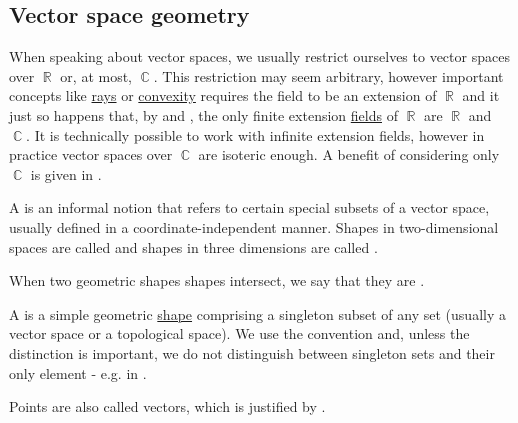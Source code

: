 \subsection{Vector space geometry}\label{subsec:vector_space_geometry}

\begin{remark}\label{rem:real_field_extensions}
  When speaking about vector spaces, we usually restrict ourselves to vector spaces over \( \BbbR \) or, at most, \( \BbbC \). This restriction may seem arbitrary, however important concepts like \hyperref[def:geometric_ray]{rays} or \hyperref[def:convex_set]{convexity} requires the field to be an extension of \( \BbbR \) and it just so happens that, by  and , the only finite extension \hyperref[def:field_extension]{fields} of \( \BbbR \) are \( \BbbR \) and \( \BbbC \). It is technically possible to work with infinite extension fields, however in practice vector spaces over \( \BbbC \) are isoteric enough. A benefit of considering only \( \BbbC \) is given in .
\end{remark}

\begin{definition}\label{def:geometric_shape}
  A  is an informal notion that refers to certain special subsets of a vector space, usually defined in a coordinate-independent manner. Shapes in two-dimensional spaces are called  and shapes in three dimensions are called .

  When two geometric shapes shapes intersect, we say that they are .
\end{definition}

\begin{definition}\label{def:point}
  A  is a simple geometric \hyperref[def:geometric_shape]{shape} comprising a singleton subset of any set (usually a vector space or a topological space). We use the convention  and, unless the distinction is important, we do not distinguish between singleton sets and their only element - e.g. in .

  Points are also called vectors, which is justified by .
\end{definition}

